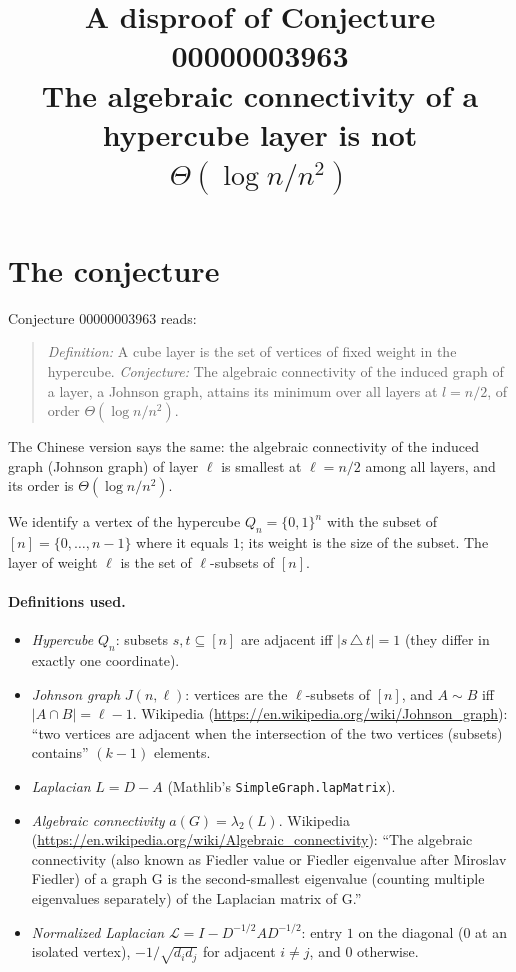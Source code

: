\documentclass[11pt]{article}
\title{A disproof of Conjecture 00000003963\\[2pt]
\large The algebraic connectivity of a hypercube layer is not $\Theta(\log n/n^2)$}
\date{}
\theoremstyle{definition}
\theoremstyle{remark}
\renewcommand{\_}{\oldus\allowbreak}
\begin{document}
\sloppy
\maketitle

\section{The conjecture}

Conjecture 00000003963 reads:

\begin{quote}
\emph{Definition:} A cube layer is the set of vertices of fixed weight in the hypercube.
\emph{Conjecture:} The algebraic connectivity of the induced graph of a layer, a Johnson graph,
attains its minimum over all layers at $l = n/2$, of order $\Theta(\log n / n^2)$.
\end{quote}
The Chinese version says the same: the algebraic connectivity of the induced graph (Johnson graph) of
layer $\ell$ is smallest at $\ell = n/2$ among all layers, and its order is $\Theta(\log n/n^2)$.

We identify a vertex of the hypercube $Q_n=\{0,1\}^n$ with the subset of $[n]=\{0,\dots,n-1\}$ where it
equals $1$; its weight is the size of the subset. The layer of weight $\ell$ is the set of
$\ell$-subsets of $[n]$.

\paragraph{Definitions used.}
\begin{itemize}[leftmargin=*]
\item \emph{Hypercube} $Q_n$: subsets $s,t\subseteq[n]$ are adjacent iff $|s\,\triangle\,t|=1$
  (they differ in exactly one coordinate).
\item \emph{Johnson graph} $J(n,\ell)$: vertices are the $\ell$-subsets of $[n]$, and $A\sim B$ iff
  $|A\cap B|=\ell-1$. Wikipedia (\url{https://en.wikipedia.org/wiki/Johnson_graph}): ``two vertices are
  adjacent when the intersection of the two vertices (subsets) contains'' $(k-1)$ elements.
\item \emph{Laplacian} $L=D-A$ (Mathlib's \texttt{SimpleGraph.lapMatrix}).
\item \emph{Algebraic connectivity} $a(G)=\lambda_2(L)$. Wikipedia
  (\url{https://en.wikipedia.org/wiki/Algebraic_connectivity}): ``The algebraic connectivity (also known
  as Fiedler value or Fiedler eigenvalue after Miroslav Fiedler) of a graph G is the second-smallest
  eigenvalue (counting multiple eigenvalues separately) of the Laplacian matrix of G.''
\item \emph{Normalized Laplacian} $\mathcal L = I - D^{-1/2}AD^{-1/2}$: entry $1$ on the diagonal
  ($0$ at an isolated vertex), $-1/\sqrt{d_id_j}$ for adjacent $i\ne j$, and $0$ otherwise.
\end{itemize}
\end{document}
